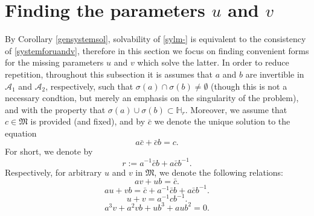 \documentclass{article}
\theoremstyle{definition}
\def\A{{\mathcal{A}}}
\def\M{\mathfrak{M}}
\def\HR{\mathbb{H}_r}
\begin{document}
\section{Finding the parameters $u$ and $v$}
By Corollary \ref{gensystemsol}, solvability of \eqref{sylm-} is equivalent to the consistency of \eqref{systemforuandv}, therefore in this section we focus on finding convenient forms for the missing parameters $u$ and $v$ which solve the latter. In order to reduce repetition, throughout this subsection it is assumes that $a$ and $b$ are invertible in $\A_1$ and $\A_2$, respectively, such that $\sigma(a)\cap\sigma(b)\neq\emptyset$ (though this is not a necessary condtion, but merely an emphasis on the singularity of the problem), and with the property that $\sigma(a)\cup\sigma(b)\subset\HR$. Moreover, we assume that $c\in\M$ is provided (and fixed), and by $\bar{c}$ we denote the unique solution to the equation 
\begin{equation}\label{barc}a\bar{c}+\bar{c}b=c.\end{equation}
For short, we denote by
\begin{equation}\label{r}
r:=a^{-1}\bar{c}b+a\bar{c}b^{-1}.
\end{equation}
Respectively, for arbitrary $u$ and $v$ in $\M$, we denote the following relations:
\begin{equation}\label{gensyl}
av+ub=\bar{c}.
\end{equation}
\begin{equation}\label{gensylvu}
au+vb=\bar{c}+a^{-1}\bar{c}b+a\bar{c}b^{-1}.
\end{equation}
 \begin{equation}\label{u+v}
u+v=a^{-1}cb^{-1}.
\end{equation}
 \begin{equation}\label{RajUchiuv}
a^3v+a^2vb+ub^3+aub^2=0.
\end{equation}
\end{document}
